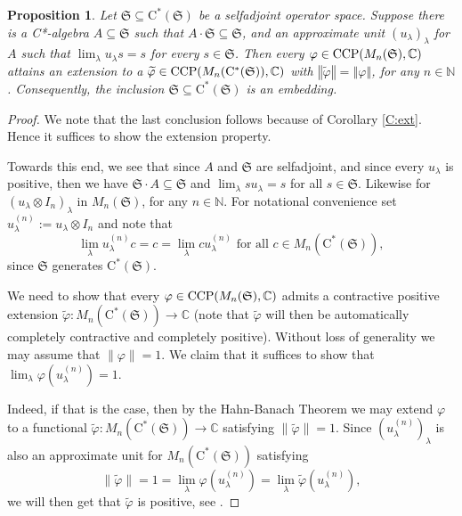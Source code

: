 \documentclass[11pt, draft]{amsart}
\numberwithin{equation}{section}
\theoremstyle{plain}
\newtheorem{proposition}[theorem]{Proposition}
\theoremstyle{definition}
\theoremstyle{remark}
\def\la{\lambda}
\newcommand\vphi{\varphi}
\newcommand{\bC}{\mathbb{C}}
\newcommand{\bN}{\mathbb{N}}
\newcommand{\fS}{{\mathfrak{S}}}
\newcommand{\foral}{\text{ for all }}
\newcommand{\ca}{\mathrm{C}^*}
\newcommand{\wt}{\widetilde}
\newcommand{\nor}[1]{\left\Vert #1\right\Vert} %
\begin{document}
\begin{proposition}\label{P:ext}
Let $\fS \subseteq \ca(\fS)$ be a selfadjoint operator space. 
Suppose there is a C*-algebra $A \subseteq \fS$ such that $A \cdot \fS \subseteq \fS$, and an approximate unit $(u_\la)_\la$ for $A$ such that $\lim_\la u_\la s = s$ for every $s\in \fS$. 
Then every $\vphi \in {\rm CCP}(M_n(\fS), \bC)$ attains an extension to a $\wt{\vphi} \in {\rm CCP}(M_n(\ca(\fS)), \bC)$ with $\nor{\wt{\vphi}} = \nor{\vphi}$, for any $n \in \bN$.
Consequently, the inclusion $\fS \subseteq \ca(\fS)$ is an embedding.
\end{proposition}

\begin{proof}
We note that the last conclusion follows because of Corollary \ref{C:ext}.
Hence it suffices to show the extension property.

Towards this end, we see that since $A$ and $\fS$ are selfadjoint, and since every $u_\la$ is positive, then we have $\fS \cdot A \subseteq \fS$ and $\lim_\la s u_\la = s$ for all $s \in \fS$.
Likewise for $(u_\la \otimes I_n)_\la$ in $M_n(\fS)$, for any $n \in \bN$.
For notational convenience set $u_\la^{(n)}:= u_\la \otimes I_{n}$ and note that 
\[
\lim_\la u_\la^{(n)} c = c = \lim_\la c u_\la^{(n)}
\foral c\in M_n(\ca(\fS)),
\]
since $\fS$ generates $\ca(\fS)$.

We need to show that every $\vphi \in {\rm CCP}(M_n(\fS), \bC)$ admits a contractive positive extension $\wt{\vphi} \colon M_n(\ca(\fS))\to \bC$ (note that $\wt{\vphi}$ will then be automatically completely contractive and completely positive). 
Without loss of generality we may assume that $\|\vphi\|=1$.
We claim that it suffices to show that $\lim_\la \vphi(u_\la^{(n)})=1$.

Indeed, if that is the case, then by the Hahn-Banach Theorem we may extend $\vphi$ to a functional $\wt{\vphi}\colon M_n(\ca(\fS))\to \bC$ satisfying $\|\wt{\vphi}\|= 1$. 
Since $(u_\la^{(n)})_\la$ is also an approximate unit for $M_n(\ca(\fS))$ satisfying 
\[
\|\wt{\vphi}\| = 1 = \lim_\la \vphi(u_\la^{(n)}) = \lim_\la\wt{\vphi}(u_\la^{(n)}),
\]
we will then get that $\wt{\vphi}$ is positive, see \cite[Theorem 3.3.3]{Mur90}.


\end{proof}
\end{document}
